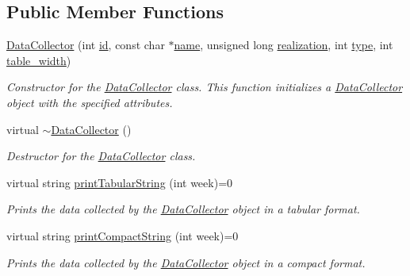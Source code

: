 \subsection*{Public Member Functions}
\begin{DoxyCompactItemize}
\item 
\mbox{\hyperlink{classDataCollector_a3f89b18f4ac0557d7374d49531a004c0}{Data\+Collector}} (int \mbox{\hyperlink{classDataCollector_a5cb840b6fbcf6afe364eef9114984383}{id}}, const char $\ast$\mbox{\hyperlink{classDataCollector_a3a9a5033592f72ada429aa20056162b9}{name}}, unsigned long \mbox{\hyperlink{classDataCollector_a9ef2887466fe3123aa19ef956a219b96}{realization}}, int \mbox{\hyperlink{classDataCollector_acad1c22d67a8eb3db056ba776a131900}{type}}, int \mbox{\hyperlink{classDataCollector_af46c27a47de92d92dcdae6b26a905a44}{table\+\_\+width}})
\begin{DoxyCompactList}\small\item\em Constructor for the \mbox{\hyperlink{classDataCollector}{Data\+Collector}} class. This function initializes a \mbox{\hyperlink{classDataCollector}{Data\+Collector}} object with the specified attributes. \end{DoxyCompactList}\item 
virtual \mbox{\hyperlink{classDataCollector_ab6e826d46e651419309efe1e635d6e14}{$\sim$\+Data\+Collector}} ()
\begin{DoxyCompactList}\small\item\em Destructor for the \mbox{\hyperlink{classDataCollector}{Data\+Collector}} class. \end{DoxyCompactList}\item 
virtual string \mbox{\hyperlink{classDataCollector_a397fccabe0223267eea8fc7cac0e59da}{print\+Tabular\+String}} (int week)=0
\begin{DoxyCompactList}\small\item\em Prints the data collected by the \mbox{\hyperlink{classDataCollector}{Data\+Collector}} object in a tabular format. \end{DoxyCompactList}\item 
virtual string \mbox{\hyperlink{classDataCollector_a2eac264fa5612aed5a830b12de4f4ae3}{print\+Compact\+String}} (int week)=0
\begin{DoxyCompactList}\small\item\em Prints the data collected by the \mbox{\hyperlink{classDataCollector}{Data\+Collector}} object in a compact format. \end{DoxyCompactList}\item 

\end{DoxyCompactItemize}
